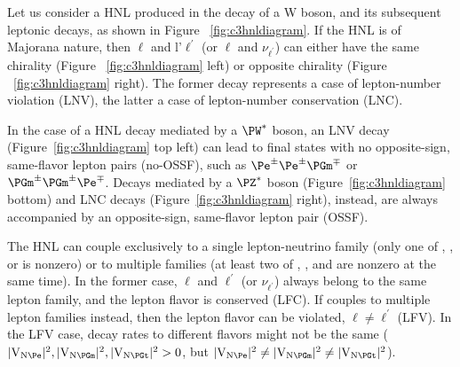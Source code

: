 


Let us consider a HNL produced in the decay of a W boson, and its subsequent leptonic decays, as shown in Figure ~\ref{fig:c3hnldiagram}. If the HNL is of Majorana nature, then $\ell$ and l'$\ell^\prime$ (or $\ell$
and $\nu_{\ell^\prime}$) can either have the same chirality (Figure ~\ref{fig:c3hnldiagram} left) or opposite chirality (Figure ~\ref{fig:c3hnldiagram} right). The former decay represents a case of lepton-number violation (LNV), the latter a case of lepton-number conservation (LNC).

In the case of a HNL decay mediated by a $\PW^\ast$ boson, an LNV decay
(Figure~\ref{fig:c3hnldiagram} top left)
can lead to final states with no opposite-sign, same-flavor lepton
pairs (no-OSSF), such as $\Pe^\pm\Pe^\pm\PGm^\mp$ or
$\PGm^\pm\PGm^\pm\Pe^\mp$.
Decays mediated by a $\PZ^\ast$ boson (Figure~\ref{fig:c3hnldiagram}
bottom) and LNC decays (Figure~\ref{fig:c3hnldiagram} right), instead, are
always accompanied by an opposite-sign, same-flavor lepton pair
(OSSF).

The HNL can couple exclusively to a single lepton-neutrino family
(\ie only one of \mixpare, \mixparm, or \mixpart is nonzero)
or to multiple families (\ie at least two of \mixpare, \mixparm,
and \mixpart are nonzero at the same time).
In the former case, $\ell$ and $\ell^\prime$ (or
$\nu_{\ell^{\prime}}$) always belong to the same lepton family,
and the lepton flavor is conserved (LFC).
If \hnl couples to multiple lepton families instead, then the
lepton flavor can be violated, $\ell\neq\ell^\prime$ (LFV).
In the LFV case, decay rates to different flavors might not be the
same ($\mixpare,\mixparm,\mixpart>0$, but
$\mixpare\neq\mixparm\neq\mixpart$).

